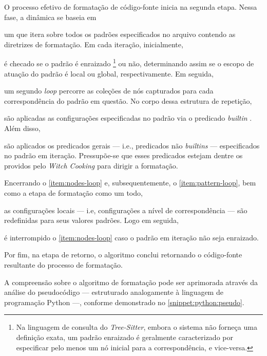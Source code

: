 \documentclass
  [11pt,a4paper,english,brazil,openright,sumario=tradicional,twoside]
  {abntex2}
\newcommand{\treesitter}{\textit{Tree-Sitter}\xspace}
\newcommand{\witchcooking}{\textit{Witch Cooking}\xspace}
\begin{document}
  O processo efetivo de formatação de código-fonte inicia na segunda etapa.
  Nessa fase, a dinâmica se baseia em
  \begin{inparaenum}
    \item \label{item:pattern-loop} um \textit{} que itera sobre
          todos os padrões especificados no arquivo contendo as diretrizes de
          formatação. Em cada iteração, inicialmente,
    \item é checado se o padrão é enraizado%
          \footnote
            { Na linguagem de consulta do \treesitter, embora o sistema não
              forneça uma definição exata, um padrão enraizado é geralmente
              caracterizado por especificar pelo menos um nó inicial para a
              correspondência, e vice-versa.}
          ou não, determinando assim se o escopo de atuação do padrão é local
          ou global, respectivamente. Em seguida,
    \item \label{item:nodes-loop} um segundo \textit{loop} percorre as coleções
          de nós capturados para cada correspondência do padrão em questão. No
          corpo dessa estrutura de repetição,
    \item são aplicadas as configurações especificadas no padrão via o
          predicado \textit{builtin} . Além disso,
    \item são aplicados os predicados gerais --- i.e., predicados não
          \textit{builtins} --- especificados no padrão em iteração.
          Pressupõe-se que esses predicados estejam dentre os providos pelo
          \witchcooking para dirigir a formatação.

          Encerrando o \cref{item:nodes-loop} e, subsequentemente, o
          \cref{item:pattern-loop}, bem como a etapa de formatação como um
          todo,
    \item as configurações locais --- i.e, configurações a nível de
          correspondência --- são redefinidas para seus valores padrões. Logo
          em seguida,
    \item é interrompido o \cref{item:nodes-loop} caso o padrão em iteração não
          seja enraizado.
  \end{inparaenum}
  Por fim, na etapa de retorno, o algoritmo conclui retornando o código-fonte
  resultante do processo de formatação.

  A compreensão sobre o algoritmo de formatação pode ser aprimorada através da
  análise do pseudocódigo --- estruturado analogamente à linguagem de
  programação Python ---, conforme demonstrado no \cref{snippet:python:pseudo}.
\end{document}
